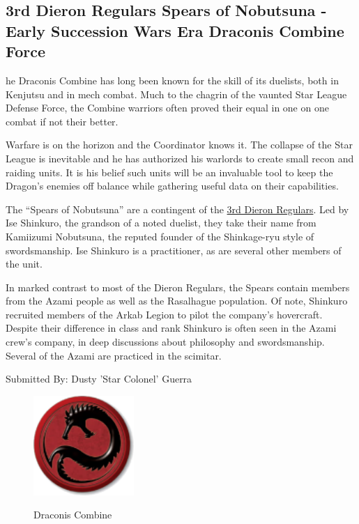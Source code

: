 \subsection{3rd Dieron Regulars Spears of Nobutsuna - Early Succession Wars Era Draconis Combine Force}

he Draconis Combine has long been known for the skill of its duelists, both in Kenjutsu and in mech combat.
Much to the chagrin of the vaunted Star League Defense Force, the Combine warriors often proved their equal in one on one combat if not their better.

Warfare is on the horizon and the Coordinator knows it.
The collapse of the Star League is inevitable and he has authorized his warlords to create small recon and raiding units.
It is his belief such units will be an invaluable tool to keep the Dragon’s enemies off balance while gathering useful data on their capabilities.

The “Spears of Nobutsuna” are a contingent of the \href{https://www.sarna.net/wiki/3rd_Dieron_Regulars}{3rd Dieron Regulars}.
Led by Ise Shinkuro, the grandson of a noted duelist, they take their name from Kamiizumi Nobutsuna, the reputed founder of the Shinkage-ryu style of swordsmanship.
Ise Shinkuro is a practitioner, as are several other members of the unit.

In marked contrast to most of the Dieron Regulars, the Spears contain members from the Azami people as well as the Rasalhague population.
Of note, Shinkuro recruited members of the Arkab Legion to pilot the company’s hovercraft.
Despite their difference in class and rank Shinkuro is often seen in the Azami crew’s company, in deep discussions about philosophy and swordsmanship.
Several of the Azami are practiced in the scimitar. 

Submitted By: Dusty 'Star Colonel' Guerra

\begin{figure}[!h]
  \centering
  \includegraphics[alt='Draconis Combine Logo', width=1.5in, height=1.486in]{img/Draconis-Combine.png}
  \caption*{Draconis Combine}
\end{figure}

